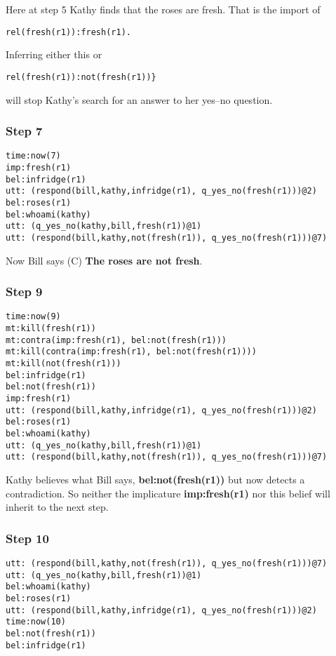 \documentclass{article}
\begin{document}
Here at step 5 Kathy finds that the roses are fresh. That is the import of

\begin{verbatim} 
rel(fresh(r1)):fresh(r1).
\end{verbatim}
 

Inferring either this or 

\begin{verbatim}
rel(fresh(r1)):not(fresh(r1))} 
\end{verbatim}

\noindent
will stop Kathy's search for an answer to her yes--no question.


\subsubsection{Step 7}
\begin{verbatim}
time:now(7)
imp:fresh(r1)
bel:infridge(r1)
utt: (respond(bill,kathy,infridge(r1), q_yes_no(fresh(r1)))@2)
bel:roses(r1)
bel:whoami(kathy)
utt: (q_yes_no(kathy,bill,fresh(r1))@1)
utt: (respond(bill,kathy,not(fresh(r1)), q_yes_no(fresh(r1)))@7)
\end{verbatim}




Now Bill says (C) {\bf The roses are not fresh}.

\subsubsection{Step 9}
\begin{verbatim}
time:now(9)
mt:kill(fresh(r1))
mt:contra(imp:fresh(r1), bel:not(fresh(r1)))
mt:kill(contra(imp:fresh(r1), bel:not(fresh(r1))))
mt:kill(not(fresh(r1)))
bel:infridge(r1)
bel:not(fresh(r1))
imp:fresh(r1)
utt: (respond(bill,kathy,infridge(r1), q_yes_no(fresh(r1)))@2)
bel:roses(r1)
bel:whoami(kathy)
utt: (q_yes_no(kathy,bill,fresh(r1))@1)
utt: (respond(bill,kathy,not(fresh(r1)), q_yes_no(fresh(r1)))@7)
\end{verbatim}

Kathy believes what Bill says, {\bf bel:not(fresh(r1))} but now
detects a contradiction. So neither the implicature {\bf
imp:fresh(r1)} nor this belief will inherit to the next step.

\subsubsection{Step 10}
\begin{verbatim}
utt: (respond(bill,kathy,not(fresh(r1)), q_yes_no(fresh(r1)))@7)
utt: (q_yes_no(kathy,bill,fresh(r1))@1)
bel:whoami(kathy)
bel:roses(r1)
utt: (respond(bill,kathy,infridge(r1), q_yes_no(fresh(r1)))@2)
time:now(10)
bel:not(fresh(r1))
bel:infridge(r1)
\end{verbatim}
\end{document}
